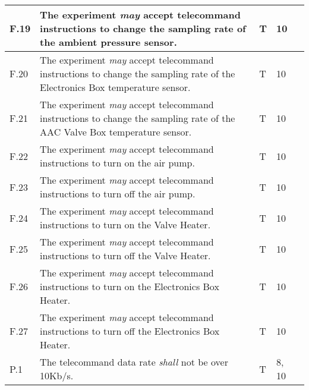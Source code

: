 \begin{longtable}[]{|m{}| m{} |m{} |m{}|m{}|}
F.19 & The experiment \textit{may} accept telecommand instructions to change the sampling rate of the ambient pressure sensor.                                                          &     T         & 10            &        \\ \hline
F.20 & The experiment \textit{may} accept telecommand instructions to change the sampling rate of the Electronics Box temperature sensor.                                                       &      T        & 10            &        \\ \hline
F.21 & The experiment \textit{may} accept telecommand instructions to change the sampling rate of the AAC Valve Box temperature sensor.                                                 &      T        & 10            &        \\ \hline
F.22 & The experiment \textit{may} accept telecommand instructions to turn on the air pump.                                                                                             &      T        & 10            &        \\ \hline
F.23 & The experiment \textit{may} accept telecommand instructions to turn off the air pump.                                                                                            &       T       & 10            &        \\ \hline
F.24 & The experiment \textit{may} accept telecommand instructions to turn on the Valve Heater.                                                                                         &      T        & 10            &        \\ \hline
F.25 & The experiment \textit{may} accept telecommand instructions to turn off the Valve Heater.                                                                                        &      T        & 10            &        \\ \hline
F.26 & The experiment \textit{may} accept telecommand instructions to turn on the Electronics Box Heater.                                                                                    &      T        & 10            &        \\ \hline
F.27 & The experiment \textit{may} accept telecommand instructions to turn off the Electronics Box Heater.                                                                                   &      T        & 10            &        \\ \hline
P.1  & The telecommand data rate \textit{shall} not be over 10Kb/s.                                                                                                                          &        T      & 8, 10            &        \\ \hline

\end{longtable}
